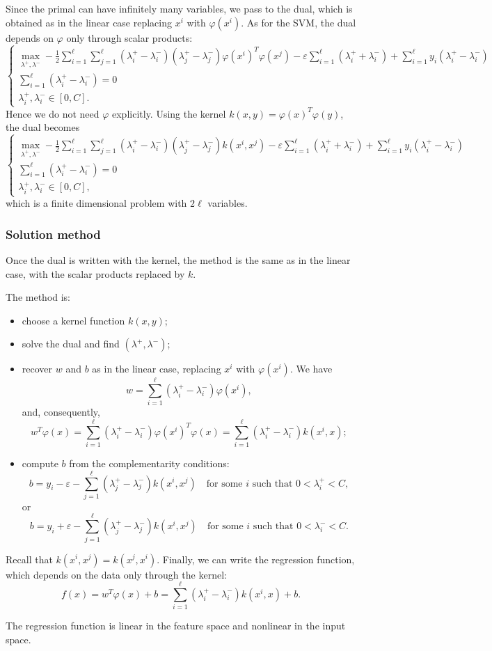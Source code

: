 Since the primal can have infinitely many variables, we pass to the dual, which is obtained as in the linear case replacing $x^i$ with $\varphi(x^i)$. As for the SVM, the dual depends on $\varphi$ only through scalar products:
\[
\begin{cases}
\displaystyle \max_{\lambda^+,\lambda^-} -\frac{1}{2}\sum_{i=1}^{\ell}\sum_{j=1}^{\ell}(\lambda_i^+ - \lambda_i^-)(\lambda_j^+ - \lambda_j^-)\varphi(x^i)^T\varphi(x^j) - \varepsilon\sum_{i=1}^{\ell}(\lambda_i^+ + \lambda_i^-) + \sum_{i=1}^{\ell}y_i(\lambda_i^+ - \lambda_i^-)\\[1ex]
\displaystyle \sum_{i=1}^{\ell}(\lambda_i^+ - \lambda_i^-) = 0\\[1ex]
\lambda_i^+, \lambda_i^- \in [0,C].
\end{cases}
\]
Hence we do not need $\varphi$ explicitly. Using the kernel $k(x,y) = \varphi(x)^T\varphi(y)$, the dual becomes
\[
\begin{cases}
\displaystyle \max_{\lambda^+,\lambda^-} -\frac{1}{2}\sum_{i=1}^{\ell}\sum_{j=1}^{\ell}(\lambda_i^+ - \lambda_i^-)(\lambda_j^+ - \lambda_j^-)k(x^i,x^j) - \varepsilon\sum_{i=1}^{\ell}(\lambda_i^+ + \lambda_i^-) + \sum_{i=1}^{\ell}y_i(\lambda_i^+ - \lambda_i^-)\\[1ex]
\displaystyle \sum_{i=1}^{\ell}(\lambda_i^+ - \lambda_i^-) = 0\\[1ex]
\lambda_i^+, \lambda_i^- \in [0,C],
\end{cases}
\]
which is a finite dimensional problem with $2\ell$ variables.

\subsubsection{Solution method}

Once the dual is written with the kernel, the method is the same as in the linear case, with the scalar products replaced by $k$.

The method is:
\begin{itemize}
    \item choose a kernel function $k(x,y)$;
    \item solve the dual and find $(\lambda^+,\lambda^-)$;
    \item recover $w$ and $b$ as in the linear case, replacing $x^i$ with $\varphi(x^i)$. We have
    \[
    w = \sum_{i=1}^{\ell}(\lambda_i^+ - \lambda_i^-)\varphi(x^i),
    \]
    and, consequently,
    \[
    w^T\varphi(x) = \sum_{i=1}^{\ell}(\lambda_i^+ - \lambda_i^-)\varphi(x^i)^T\varphi(x) = \sum_{i=1}^{\ell}(\lambda_i^+ - \lambda_i^-)k(x^i,x);
    \]
    \item compute $b$ from the complementarity conditions:
    \[
    b = y_i - \varepsilon - \sum_{j=1}^{\ell}(\lambda_j^+ - \lambda_j^-)k(x^i,x^j) \quad \text{for some } i \text{ such that } 0 < \lambda_i^+ < C,
    \]
    or
    \[
    b = y_i + \varepsilon - \sum_{j=1}^{\ell}(\lambda_j^+ - \lambda_j^-)k(x^i,x^j) \quad \text{for some } i \text{ such that } 0 < \lambda_i^- < C.
    \]
\end{itemize}
Recall that $k(x^i,x^j) = k(x^j,x^i)$. Finally, we can write the regression function, which depends on the data only through the kernel:
\[
f(x) = w^T\varphi(x) + b = \sum_{i=1}^{\ell}(\lambda_i^+ - \lambda_i^-)k(x^i,x) + b.
\]

\begin{remark}
The regression function is linear in the feature space and nonlinear in the input space.
\end{remark}
